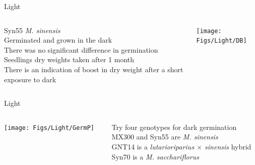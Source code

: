 \documentclass[10pt]{beamer}
\begin{document}
\begin{frame}{Light}
  \begin{columns}[T]
    \begin{column}{.5\textwidth}
		Syn55 \textit{M. sinensis}\\ \vspace{5mm}
		Germinated and grown in the dark \\ \vspace{5mm}
		There was no significant difference in germination\\ \vspace{5mm}
		Seedlings dry weights taken after 1 month\\ \vspace{5mm}
		There is an indication of boost in dry weight after a short exposure to dark
    \end{column}
    \begin{column}{.5\textwidth}
	\texttt{[image: Figs/Light/DB]}
    \end{column}
  \end{columns}
\end{frame}


\begin{frame}{Light}
  \begin{columns}[T]
    \begin{column}{.5\textwidth}
	\texttt{[image: Figs/Light/GermP]}
    \end{column}
    \begin{column}{.5\textwidth}
		Try four genotypes for dark germination \\ \vspace{5mm}
		MX300 and Syn55 are \textit{M. sinensis}\\ \vspace{5mm}
		GNT14 is a \textit{lutarioriparius $\times$ sinensis} hybrid\\ \vspace{5mm}
		Syn70 is a \textit{M. sacchariflorus}
    \end{column}
  \end{columns}
\end{frame}
\end{document}
